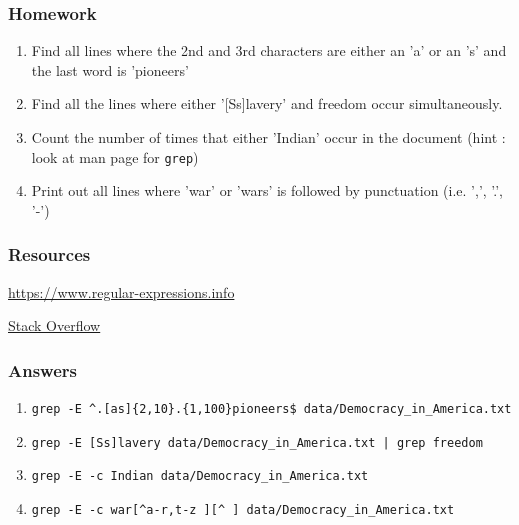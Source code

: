 \documentclass{beamer}
\newcommand{\code}[1]{\colorbox{codegray}{\texttt{#1}}}
\begin{document}
\begin{frame}
\frametitle{Homework}
\begin{enumerate}
    \item Find all lines where the 2nd and 3rd characters are either an 'a' or an 's' and the last word is 'pioneers'
    \pause
    \item Find all the lines where either '[Ss]lavery' and freedom occur simultaneously.
    \pause
    \item Count the number of times that either 'Indian' occur in the document (hint : look at man page for \code{grep})
    \pause
    \item Print out all lines where 'war' or 'wars' is followed by punctuation (i.e. ',', '.', '-')
\end{enumerate}
\end{frame}





\begin{frame}
\frametitle{Resources}

\href{https://www.regular-expressions.info/}{https://www.regular-expressions.info}

\href{https://stackoverflow.com/}{Stack Overflow}

\end{frame}


\begin{frame}
\frametitle{Answers}
\scriptsize 
\begin{enumerate}
    \item \code{grep -E \^{}.[as]\{2,10\}.\{1,100\}pioneers\$ data/Democracy\_in\_America.txt}
    \pause
    \item \code{grep -E [Ss]lavery data/Democracy\_in\_America.txt  | grep freedom}
    \pause
    \item \code{grep -E -c Indian data/Democracy\_in\_America.txt}
    \pause
    \item \code{grep -E -c war[\^{}a-r,t-z\ ][\^{}\ ] data/Democracy\_in\_America.txt}
\end{enumerate}
\end{frame}
\end{document}
